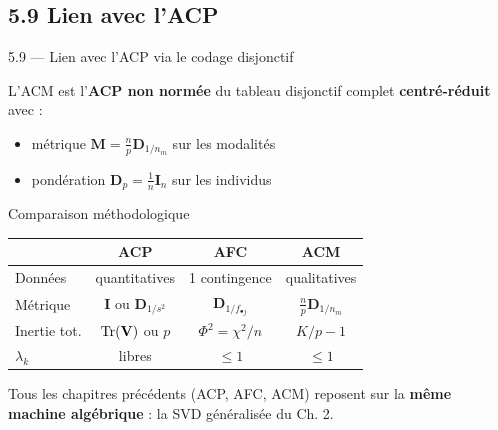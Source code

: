 \subsection{5.9 Lien avec l'ACP}
\begin{frame}{5.9 — Lien avec l'ACP via le codage disjonctif}
\begin{theorem}
L'ACM est l'\textbf{ACP non normée} du tableau disjonctif complet
\textbf{centré-réduit} avec :
\begin{itemize}
  \item métrique $\mathbf{M} = \frac{n}{p}\mathbf{D}_{1/n_m}$ sur les modalités
  \item pondération $\mathbf{D}_p = \frac{1}{n}\mathbf{I}_n$ sur les individus
\end{itemize}
\end{theorem}

\begin{block}{Comparaison méthodologique}
\centering
\footnotesize
\begin{tabular}{l|ccc}
\toprule
 & \textbf{ACP} & \textbf{AFC} & \textbf{ACM} \\
\midrule
Données      & quantitatives & 1 contingence & qualitatives \\
Métrique     & $\mathbf{I}$ ou $\mathbf{D}_{1/s^2}$ & $\mathbf{D}_{1/f_{\bullet j}}$ & $\frac{n}{p}\mathbf{D}_{1/n_m}$ \\
Inertie tot. & $\operatorname{Tr}(\mathbf{V})$ ou $p$ & $\Phi^2 = \chi^2/n$ & $K/p - 1$ \\
$\lambda_k$  & libres & $\leq 1$ & $\leq 1$ \\
\bottomrule
\end{tabular}
\end{block}

\begin{rema}
\small Tous les chapitres précédents (ACP, AFC, ACM) reposent sur la
\textbf{même machine algébrique} : la SVD généralisée du Ch. 2.
\end{rema}
\end{frame}

